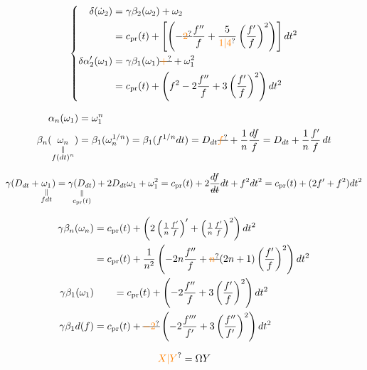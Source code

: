 \[ \left\{\begin{aligned}
 \delta(\dot\omega_2)&=\gamma\beta_2(\omega_2)+\omega_2\\
 &=c_{\mathrm{pr}}(t)+\left[\left(-\deleted{\unsure{2}}\frac{f''}{f}+\frac{5}{\unsure{1|4}}\left(\frac{f'}{f}\right)^2\right)\right]dt^2\\
 \delta\alpha'_2(\omega_1)&=\gamma\beta_1(\omega_1)\deleted{\unsure{+}}+\omega_1^2\\
 &=c_{\mathrm{pr}}(t)+\left(f^2-2\frac{f''}{f}+3\left(\frac{f'}f\right)^2\right)dt^2
 \end{aligned}\right. \]

\[ \begin{aligned}
 \alpha_n(\omega_1)&=\omega_1^n\\
 \beta_n(\underset{\substack{\Vert\\f(dt)^n}}{\omega_n})&=\beta_1(\omega_n^{1/n})=\beta_1(f^{1/n}dt)=D_{dt}\deleted{\unsure{f}}+\frac1n\frac{df}{f}=D_{dt}+\frac1n\frac{f'}f\,dt
 \end{aligned} \]

\[ \gamma(D_{dt}+\underset{\substack{\Vert\\fdt}}{\omega_1})
 =\underset{\substack{\Vert\\c_{\mathrm{pr}}(t)}}{\gamma(D_{dt})}+2D_{dt}\omega_1+\omega_1^2
 =c_{\mathrm{pr}}(t)+2\frac{df}{\deleted{dt}}dt+f^2dt^2
 =c_{\mathrm{pr}}(t)+(2f'+f^2)dt^2 \]

\[ \begin{aligned}
 \gamma\beta_n(\omega_n)&=c_{\mathrm{pr}}(t)+\left(2\left(\tfrac1n\tfrac{f'}f\right)'+\left(\tfrac1n\tfrac{f'}f\right)^2\right)dt^2\\
 &=c_{\mathrm{pr}}(t)+\frac1{n^2}\left(-2n\frac{f''}{f}+\deleted{\unsure{n}}(2n+1)\left(\frac{f'}f\right)^2\right)dt^2\\
 \gamma\beta_1(\omega_1)&\qquad=c_{\mathrm{pr}}(t)+\left(-2\frac{f''}{f}+3\left(\frac{f'}f\right)^2\right)dt^2\\
 \gamma\beta_1d(f)&=c_{\mathrm{pr}}(t)+\deleted{\unsure{-2}}\left(-2\frac{f'''}{f'}+3\left(\frac{f''}{f'}\right)^2\right)dt^2
 \end{aligned} \]


\[ \unsure{X|Y}=\Omega Y \]


